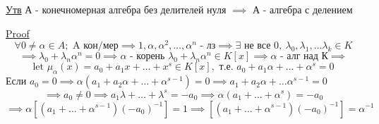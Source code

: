 \documentclass[a4paper]{article}
\begin{document}
\begin{tcolorbox}
\underline{Утв} А - конечномерная алгебра без делителей нуля $ \implies $ А - 
алгебра с делением

\underline{Proof}
\[
    \forall 0 \neq \alpha \in A; \text{ A кон/мер} \implies 1, \alpha, \alpha^2,
    \dots, \alpha^n \text{ - лз} \implies \exists \text{ не все 0}, \ 
    \lambda_0, \lambda_1, \dots \lambda_k \in K
\]
\[
    \implies \lambda_0 + \lambda_n \alpha^n = 0 \implies \alpha \text{ - корень }
    \lambda_0 + \lambda_n \alpha^n \in K[x] \implies \alpha \text{ - алг над К} \implies
\]
\[
    \text{let } \mu_{\alpha}(x) = a_0 + a_1 x + \dots + x^{s} \in K[x],
    \text{ т.е. } a_0 + a_1 \alpha + \dots + \alpha^s = 0
\]
Если $ a_0 = 0 \implies \alpha(a_1 + a_2 \alpha + \dots + \alpha^{s-1}) = 0 \implies
a_1 + a_2\alpha + \dots \alpha^{s-1} = 0$ 
\[
    \implies a_0 \neq 0 \implies a_1 \lambda + \dots + \lambda^s = 
    - a_0 \implies \alpha(a_1 + \dots + \alpha^s) = -a_0
\]
\[
    \implies \alpha [ (a_1 + \dots + \alpha^{s-1})(-a_0)^{-1} ] = 1
    \implies [ (a_1 + \dots + \alpha^{s-1})(-a_0)^{-1} ] = \alpha^{-1}
\]
\end{tcolorbox}
\end{document}
